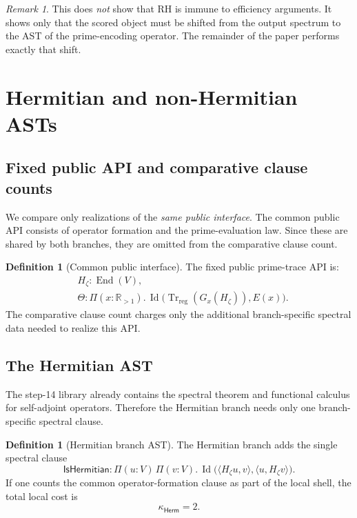 \documentclass[11pt,a4paper]{article}
\theoremstyle{plain}
\theoremstyle{definition}
\newtheorem{definition}[theorem]{Definition}
\theoremstyle{remark}
\newtheorem{remark}[theorem]{Remark}
\newcommand{\R}{\mathbb{R}}
\newcommand{\Trreg}{\operatorname{Tr}_{\mathrm{reg}}}
\newcommand{\End}{\operatorname{End}}
\newcommand{\Id}{\operatorname{Id}}
\newcommand{\effort}{\kappa}
\newcommand{\herm}{\ensuremath{\mathsf{Herm}}}
\begin{document}
\begin{remark}
This does \emph{not} show that RH is immune to efficiency arguments. It shows only that the scored object must be shifted from the output spectrum to the AST of the prime-encoding operator. The remainder of the paper performs exactly that shift.
\end{remark}

\section{Hermitian and non-Hermitian ASTs}

\subsection{Fixed public API and comparative clause counts}

We compare only realizations of the \emph{same public interface}. The common public API consists of operator formation and the prime-evaluation law. Since these are shared by both branches, they are omitted from the comparative clause count.

\begin{definition}[Common public interface]
\label{def:commonapi}
The fixed public prime-trace API is:
\begin{align*}
& H_\zeta : \End(V), \\
& \Theta : \Pi(x:\R_{>1}).\, \Id\bigl(\Trreg(G_x(H_\zeta)), E(x)\bigr).
\end{align*}
The comparative clause count charges only the additional branch-specific spectral data needed to realize this API.
\end{definition}

\subsection{The Hermitian AST}

The step-14 library already contains the spectral theorem and functional calculus for self-adjoint operators. Therefore the Hermitian branch needs only one branch-specific spectral clause.

\begin{definition}[Hermitian branch AST]
\label{def:herm-ast}
The Hermitian branch adds the single spectral clause
\[
\mathsf{IsHermitian} : \Pi(u:V)\,\Pi(v:V).\,\Id\bigl(\langle H_\zeta u,v\rangle,\langle u,H_\zeta v\rangle\bigr).
\]
If one counts the common operator-formation clause as part of the local shell, the total local cost is
\[
\effort_{\herm}=2.
\]
\end{definition}
\end{document}

